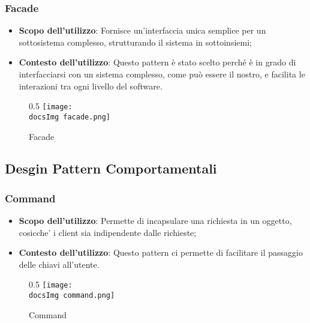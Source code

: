 		\subsubsection{Facade} 
		 \begin{itemize}
		 		\item\textbf{Scopo dell'utilizzo}: Fornisce un'interfaccia unica semplice per un sottosistema complesso, strutturando il sistema in sottoinsiemi;
		 		\item\textbf{Contesto dell'utilizzo}: Questo pattern è stato scelto perché è in grado di interfacciarsi con un sistema complesso, come può essere il nostro, e facilita le interazioni tra ogni livello del software. 
		 \end{itemize}		 	
		\begin{figure}[H]{0.5}
			\centering
			\texttt{[image: \\docsImg facade.png]}
			\caption{Facade}
			\label{fig. Facade}	
		\end{figure}
		 		
	\subsection{Desgin Pattern Comportamentali} 
		
		\subsubsection{Command}
		\begin{itemize} \itemsep1pt
			\item \textbf{Scopo dell'utilizzo}: Permette di incapsulare una richiesta in un oggetto, cosicche' i client sia indipendente dalle richieste;
			\item \textbf{Contesto dell'utilizzo}: Questo pattern ci permette di facilitare il passaggio delle chiavi all'utente.
		\end{itemize}
		\begin{figure}[H]{0.5}
			\centering
			\texttt{[image: \\docsImg command.png]}
			\caption{Command}
			\label{fig. Command}
		\end{figure}
			
		